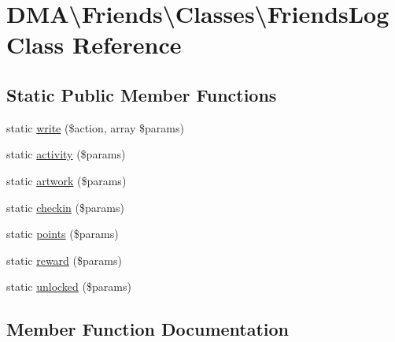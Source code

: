 \hypertarget{classDMA_1_1Friends_1_1Classes_1_1FriendsLog}{}\section{D\+M\+A\textbackslash{}Friends\textbackslash{}Classes\textbackslash{}Friends\+Log Class Reference}
\label{classDMA_1_1Friends_1_1Classes_1_1FriendsLog}
\subsection*{Static Public Member Functions}
\begin{DoxyCompactItemize}
\item 
static \hyperlink{classDMA_1_1Friends_1_1Classes_1_1FriendsLog_a99a5a2ee4bc69aab07f58308d9cee669}{write} (\$action, array \$params)
\item 
static \hyperlink{classDMA_1_1Friends_1_1Classes_1_1FriendsLog_a0b90db29da51f53991f2dcc1a55f14c7}{activity} (\$params)
\item 
static \hyperlink{classDMA_1_1Friends_1_1Classes_1_1FriendsLog_aa3c63d0a5b1ffcd9f58c03e443a2dc8f}{artwork} (\$params)
\item 
static \hyperlink{classDMA_1_1Friends_1_1Classes_1_1FriendsLog_ae6c33847a3d3f094a3bd27ac2dbbfa72}{checkin} (\$params)
\item 
static \hyperlink{classDMA_1_1Friends_1_1Classes_1_1FriendsLog_a083fa01b3e143ca77bdbb1562db724de}{points} (\$params)
\item 
static \hyperlink{classDMA_1_1Friends_1_1Classes_1_1FriendsLog_a9f38b9c2e3b1c9d36bc7a1247b2571eb}{reward} (\$params)
\item 
static \hyperlink{classDMA_1_1Friends_1_1Classes_1_1FriendsLog_ac7705d4873f6b3156efde3e049a21ca6}{unlocked} (\$params)
\end{DoxyCompactItemize}


\subsection{Member Function Documentation}
\hypertarget{classDMA_1_1Friends_1_1Classes_1_1FriendsLog_a0b90db29da51f53991f2dcc1a55f14c7}{}
